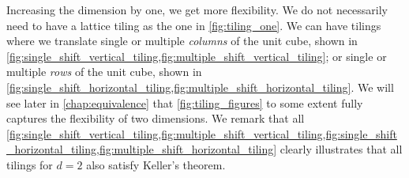 \documentclass[../thesis.tex]{subfiles}
\begin{document}
Increasing the dimension by one, we get more flexibility. We do not necessarily need to have a lattice tiling as the one in \cref{fig:tiling_one}. We can have tilings where we translate single or multiple \emph{columns} of the unit cube, shown in \cref{fig:single_shift_vertical_tiling,fig:multiple_shift_vertical_tiling}; or single or multiple \emph{rows} of the unit cube, shown in \cref{fig:single_shift_horizontal_tiling,fig:multiple_shift_horizontal_tiling}. We will see later in \cref{chap:equivalence} that \cref{fig:tiling_figures} to some extent fully captures the flexibility of two dimensions. We remark that all \cref{fig:single_shift_vertical_tiling,fig:multiple_shift_vertical_tiling,fig:single_shift_horizontal_tiling,fig:multiple_shift_horizontal_tiling} clearly illustrates that all tilings for $d=2$ also satisfy Keller's theorem. 







\end{document}
